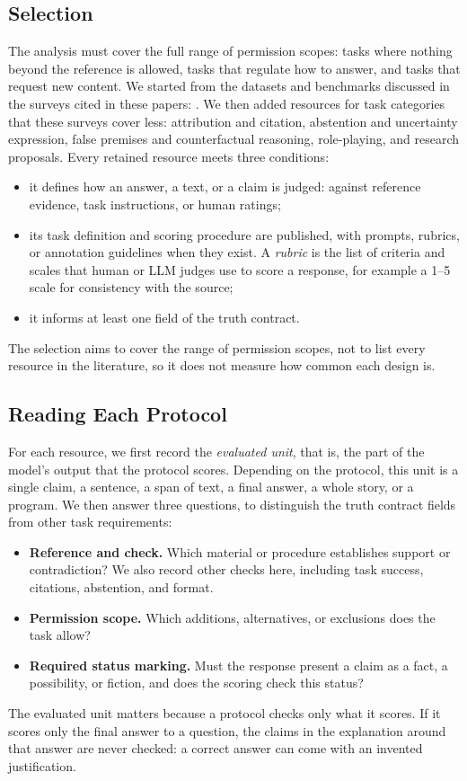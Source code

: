\documentclass{clv2025}
\begin{document}
\subsection{Selection}\label{subsec:selection}

The analysis must cover the full range of permission scopes: tasks where
nothing beyond the reference is allowed, tasks that regulate how to answer,
and tasks that request new content. We started from the datasets and
benchmarks discussed in the surveys cited in these papers:
\citep{ji_survey_2023,huang_survey_2025,jiang_survey_2024,
franceschelli_creativity_2024}. We then added resources for task
categories that these surveys cover less: attribution and citation,
abstention and uncertainty expression, false premises and counterfactual
reasoning, role-playing, and research proposals. Every retained resource
meets three conditions:
\begin{itemize}
\item it defines how an answer, a text, or a claim is judged: against
reference evidence, task instructions, or human ratings;
\item its task definition and scoring procedure are published, with
prompts, rubrics, or annotation guidelines when they exist. A
\emph{rubric} is the list of criteria and scales that human or LLM judges
use to score a response, for example a 1--5 scale for consistency with the
source;
\item it informs at least one field of the truth contract.
\end{itemize}
The selection aims to cover the range of permission scopes, not to list
every resource in the literature, so it does not measure how common each
design is.

\subsection{Reading Each Protocol}\label{subsec:criteria}

For each resource, we first record the \emph{evaluated unit}, that is, the
part of the model's output that the protocol scores. Depending on the
protocol, this unit is a single claim, a sentence, a span of text, a final
answer, a whole story, or a program. We then answer three questions, to
distinguish the truth contract fields from other task requirements:
\begin{itemize}
\item \textbf{Reference and check.} Which material or procedure establishes
support or contradiction? We also record other checks here, including
task success, citations, abstention, and format.
\item \textbf{Permission scope.} Which additions, alternatives, or
exclusions does the task allow?
\item \textbf{Required status marking.} Must the response present a claim
as a fact, a possibility, or fiction, and does the scoring check this status?
\end{itemize}
The evaluated unit matters because a protocol checks only what it scores.
If it scores only the final answer to a question, the claims in the
explanation around that answer are never checked: a correct answer can
come with an invented justification.
\end{document}
